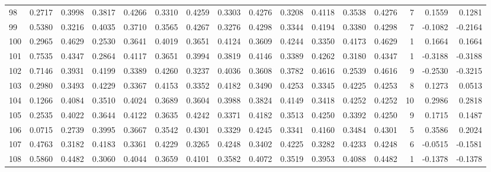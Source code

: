 \begin{tabular}{lrrrrrrrrrrrrrrr}
98  &      0.2717 &  0.3998 &  0.3817 &  0.4266 &  0.3310 &  0.4259 &  0.3303 &  0.4276 &  0.3208 &  0.4118 &   0.3538 &     0.4276 &      7 &                    0.1559 &                     0.1281 \\
99  &      0.5380 &  0.3216 &  0.4035 &  0.3710 &  0.3565 &  0.4267 &  0.3276 &  0.4298 &  0.3344 &  0.4194 &   0.3380 &     0.4298 &      7 &                   -0.1082 &                    -0.2164 \\
100 &      0.2965 &  0.4629 &  0.2530 &  0.3641 &  0.4019 &  0.3651 &  0.4124 &  0.3609 &  0.4244 &  0.3350 &   0.4173 &     0.4629 &      1 &                    0.1664 &                     0.1664 \\
101 &      0.7535 &  0.4347 &  0.2864 &  0.4117 &  0.3651 &  0.3994 &  0.3819 &  0.4146 &  0.3389 &  0.4262 &   0.3180 &     0.4347 &      1 &                   -0.3188 &                    -0.3188 \\
102 &      0.7146 &  0.3931 &  0.4199 &  0.3389 &  0.4260 &  0.3237 &  0.4036 &  0.3608 &  0.3782 &  0.4616 &   0.2539 &     0.4616 &      9 &                   -0.2530 &                    -0.3215 \\
103 &      0.2980 &  0.3493 &  0.4229 &  0.3367 &  0.4153 &  0.3352 &  0.4182 &  0.3490 &  0.4253 &  0.3345 &   0.4225 &     0.4253 &      8 &                    0.1273 &                     0.0513 \\
104 &      0.1266 &  0.4084 &  0.3510 &  0.4024 &  0.3689 &  0.3604 &  0.3988 &  0.3824 &  0.4149 &  0.3418 &   0.4252 &     0.4252 &     10 &                    0.2986 &                     0.2818 \\
105 &      0.2535 &  0.4022 &  0.3644 &  0.4122 &  0.3635 &  0.4242 &  0.3371 &  0.4182 &  0.3513 &  0.4250 &   0.3392 &     0.4250 &      9 &                    0.1715 &                     0.1487 \\
106 &      0.0715 &  0.2739 &  0.3995 &  0.3667 &  0.3542 &  0.4301 &  0.3329 &  0.4245 &  0.3341 &  0.4160 &   0.3484 &     0.4301 &      5 &                    0.3586 &                     0.2024 \\
107 &      0.4763 &  0.3182 &  0.4183 &  0.3361 &  0.4229 &  0.3265 &  0.4248 &  0.3402 &  0.4225 &  0.3282 &   0.4233 &     0.4248 &      6 &                   -0.0515 &                    -0.1581 \\
108 &      0.5860 &  0.4482 &  0.3060 &  0.4044 &  0.3659 &  0.4101 &  0.3582 &  0.4072 &  0.3519 &  0.3953 &   0.4088 &     0.4482 &      1 &                   -0.1378 &                    -0.1378 \\

\end{tabular}
